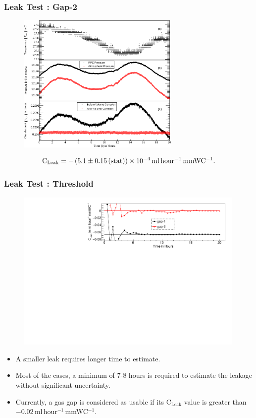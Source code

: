 \documentclass{beamer}
\begin{document}
\begin{frame}
  \frametitle{Leak Test : Gap-2}
  \begin{figure}[!h]
    \includegraphics[width=0.7\textwidth]{all_130_gen.png}
    \vspace{-8pt}
  \end{figure}
  \[\textrm{C}_{\textrm{Leak}}=-\left(5.1\pm 0.15\left(\textrm{stat}\right)\right)\times 10^{-4}\textrm{\,ml\,hour$^{-1}$\,mmWC$^{-1}$}.\]
\end{frame}


\begin{frame}
  \frametitle{Leak Test : Threshold}
  \begin{figure}[!h]
    \vspace{-8pt}
    \includegraphics[width=0.99\textwidth]{conf_57_130.pdf}
    \vspace{-8pt}
  \end{figure}
  \begin{itemize}
  \item A smaller leak requires longer time to estimate.
  \item Most of the cases, a minimum of 7-8 hours is required to
    estimate the leakage without significant uncertainty.
  \item Currently, a gas gap is considered as usable if its
    $\textrm{C}_{\textrm{Leak}}$ value is greater than
    $-0.02$\,ml\,hour$^{-1}$\,mmWC$^{-1}$.
  \end{itemize}
\end{frame}
\end{document}
